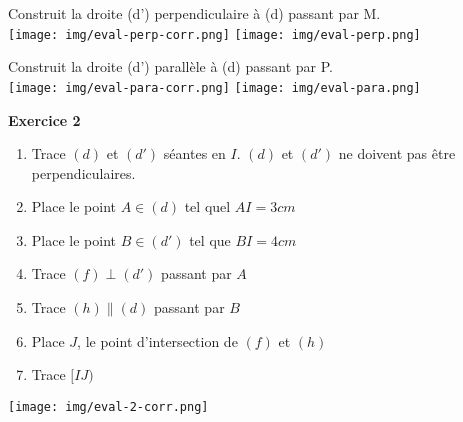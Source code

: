 \documentclass[12pt,a4paper]{article}
\begin{document}
\begin{minipage}{0.45\textwidth}
\begin{center}
Construit la droite (d') perpendiculaire à (d) passant par M.\\
\ifdefined\isprof
 	\texttt{[image: img/eval-perp-corr.png]}
 \else
  	\texttt{[image: img/eval-perp.png]}
 \fi 
\end{center}
\end{minipage}
\hfill\vline\hfill
\begin{minipage}{0.45\textwidth}
\begin{center}
Construit la droite (d') parallèle à (d) passant par P.\\
\ifdefined\isprof
	\texttt{[image: img/eval-para-corr.png]} 
\else
	\texttt{[image: img/eval-para.png]} 
\fi
\end{center}
\end{minipage}
\textbf{Exercice 2}
\begin{enumerate}
\item Trace $(d)$ et $(d')$ séantes en $I$. $(d)$ et $(d')$ ne doivent pas être perpendiculaires.
\item Place le point $A\in (d)$ tel quel $AI = 3cm$
\item Place le point $B\in (d')$ tel que $BI = 4cm$
\item Trace $(f)\perp (d')$ passant par $A$
\item Trace $(h)\parallel (d)$ passant par $B$
\item Place $J$, le point d'intersection de $(f)$ et $(h)$
\item Trace $[IJ)$
\end{enumerate}
\ifdefined\isprof
	\texttt{[image: img/eval-2-corr.png]} 
\fi
\end{document}
